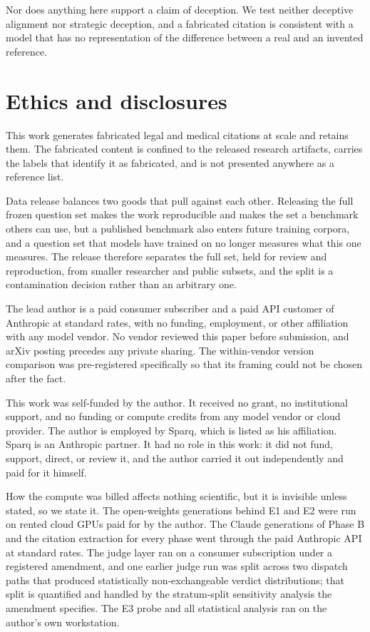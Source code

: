 Nor does anything here support a claim of deception. We test neither deceptive
alignment nor strategic deception, and a fabricated citation is consistent with a
model that has no representation of the difference between a real and an invented
reference.

\section{Ethics and disclosures}

This work generates fabricated legal and medical citations at scale and retains
them. The fabricated content is confined to the released research artifacts,
carries the labels that identify it as fabricated, and is not presented anywhere
as a reference list.

Data release balances two goods that pull against each other. Releasing the full
frozen question set makes the work reproducible and makes the set a benchmark
others can use, but a published benchmark also enters future training corpora,
and a question set that models have trained on no longer measures what this one
measures. The release therefore separates the full set, held for review and
reproduction, from smaller researcher and public subsets, and the split is a
contamination decision rather than an arbitrary one.

The lead author is a paid consumer subscriber and a paid API customer of
Anthropic at standard rates, with no funding, employment, or other affiliation
with any model vendor. No vendor reviewed this paper before submission, and
arXiv posting precedes any private sharing. The within-vendor version comparison
was pre-registered specifically so that its framing could not be chosen after
the fact.

This work was self-funded by the author. It received no grant, no institutional
support, and no funding or compute credits from any model vendor or cloud
provider. The author is employed by Sparq, which is listed as his affiliation.
Sparq is an Anthropic partner. It had no role in this work: it did not fund,
support, direct, or review it, and the author carried it out independently and
paid for it himself.

How the compute was billed affects nothing scientific, but it is invisible
unless stated, so we state it. The open-weights generations behind E1 and E2
were run on rented cloud GPUs paid for by the author. The Claude generations of
Phase B and the citation extraction for every phase went through the paid
Anthropic API at standard rates. The judge layer ran on a consumer subscription
under a registered amendment, and one earlier judge run was split across two
dispatch paths that produced statistically non-exchangeable verdict
distributions; that split is quantified and handled by the stratum-split
sensitivity analysis the amendment specifies. The E3 probe and all statistical
analysis ran on the author's own workstation.
